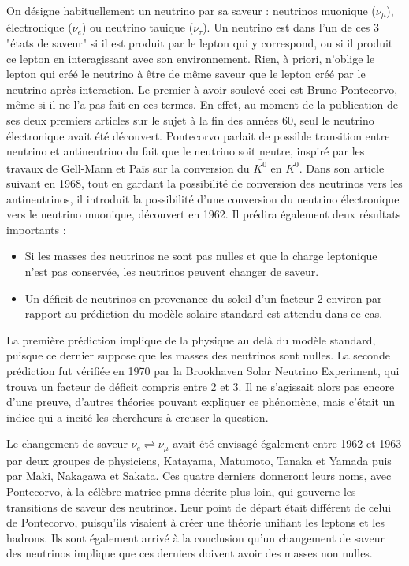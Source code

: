             On désigne habituellement un neutrino par sa saveur : neutrinos muonique ($\nu_{\mu}$), électronique ($\nu_e$) ou neutrino tauique ($\nu_{\tau}$). Un neutrino est dans l'un de ces 3 "états de saveur" si il est produit par le lepton qui y correspond, ou si il produit ce lepton en interagissant avec son environnement. Rien, à priori, n'oblige le lepton qui créé le neutrino à être de même saveur que le lepton créé par le neutrino après interaction. Le premier à avoir soulevé ceci est Bruno Pontecorvo, même si il ne l'a pas fait en ces termes. En effet, au moment de la publication de ses deux premiers articles\cite{Pontecorvo:1957cp,Pontecorvo:1957qd} sur le sujet à la fin des années 60, seul le neutrino électronique avait été découvert. Pontecorvo parlait de possible transition entre neutrino et antineutrino du fait que le neutrino soit neutre, inspiré par les travaux de Gell-Mann et Païs\cite{Gell-Mann1955} sur la conversion du $\overline{K^0}$ en  $K^0$. Dans son article suivant en 1968\cite{Pontecorvo1968}, tout en gardant la possibilité de conversion des neutrinos vers les antineutrinos, il introduit la possibilité d'une conversion du neutrino électronique vers le neutrino muonique, découvert en 1962\cite{Danby1962}. Il prédira également deux résultats importants :
            \begin{itemize}
                \item Si les masses des neutrinos ne sont pas nulles et que la charge leptonique n'est pas conservée, les neutrinos peuvent changer de saveur.
                \item Un déficit de neutrinos en provenance du soleil d'un facteur 2 environ par rapport au prédiction du modèle solaire standard est attendu dans ce cas.
            \end{itemize}
            La première prédiction implique de la physique au delà du modèle standard, puisque ce dernier suppose que les masses des neutrinos sont nulles. La seconde prédiction fut vérifiée en 1970 par la Brookhaven Solar Neutrino Experiment\cite{Bahcall1976}, qui trouva un facteur de déficit compris entre 2 et 3. Il ne s'agissait alors pas encore d'une preuve, d'autres théories pouvant expliquer ce phénomène, mais c'était un indice qui a incité les chercheurs à creuser la question.
            
            Le changement de saveur $\nu_e\rightleftharpoons\nu_{\mu}$ avait été envisagé également entre 1962 et 1963 par deux groupes de physiciens, Katayama, Matumoto, Tanaka et Yamada\cite{Nakagawa1963} puis par Maki,  Nakagawa et  Sakata\cite{Maki1962}. Ces quatre derniers donneront leurs noms, avec Pontecorvo, à la célèbre matrice \gls{pmns} décrite plus loin, qui gouverne les transitions de saveur des neutrinos. Leur point de départ était différent de celui de Pontecorvo, puisqu'ils visaient à créer une théorie unifiant les leptons et les hadrons. Ils sont également arrivé à la conclusion qu'un changement de saveur des neutrinos implique que ces derniers doivent avoir des masses non nulles.
            
